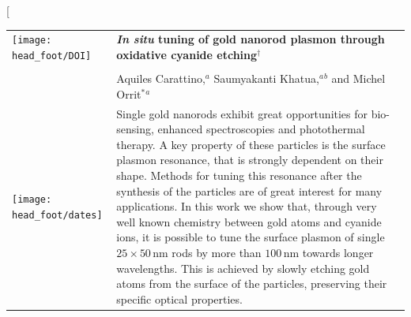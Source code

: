 \documentclass[twoside,twocolumn,11pt]{article}
\newcommand{\nm}{\ensuremath{\,\textrm{nm}}}
\begin{document}
\makeatletter 
\newlength{\figrulesep} 
\setlength{\figrulesep}{0.5\textfloatsep} 

\newcommand{\topfigrule}{\vspace*{-1pt}%
\noindent{\color{cream}\rule[-\figrulesep]{\columnwidth}{1.5pt}} }

\newcommand{\botfigrule}{\vspace*{-2pt}%
\noindent{\color{cream}\rule[\figrulesep]{\columnwidth}{1.5pt}} }

\newcommand{\dblfigrule}{\vspace*{-1pt}%
\noindent{\color{cream}\rule[-\figrulesep]{\textwidth}{1.5pt}} }

\makeatother

\twocolumn[
  \begin{@twocolumnfalse}
\vspace{3cm}
\sffamily
\begin{tabular}{m{4.5cm} p{13.5cm} }

\texttt{[image: head\_foot/DOI]} & \noindent\LARGE{\textbf{\textit{In situ} tuning of gold nanorod plasmon through oxidative cyanide
etching$^\dag$}} \\
\vspace{0.3cm} & \vspace{0.3cm} \\

 & \noindent\large{Aquiles Carattino,\textit{$^{a}$} Saumyakanti
 Khatua,\textit{$^{a}$}\textit{$^{b}$} and Michel Orrit$^{\ast}$\textit{$^{a}$}} \\%

\texttt{[image: head\_foot/dates]} & \noindent\normalsize{	Single gold nanorods exhibit great opportunities for
	bio-sensing, enhanced spectroscopies and photothermal therapy. A key property of these
	particles is the surface plasmon resonance, that is strongly dependent on their
	shape. Methods for tuning this resonance after the synthesis of the particles
	are of great interest for many applications. In this work we show that, through
	very well known chemistry between gold atoms and cyanide ions, it is possible
	to tune the surface plasmon of single $25\times50\nm$ rods by more than $100\nm$
	towards longer wavelengths. This is achieved by slowly etching gold atoms from
	the surface of the particles, preserving their specific optical properties.} \\%

\end{tabular}

 \end{@twocolumnfalse} \vspace{0.6cm}
\end{document}
